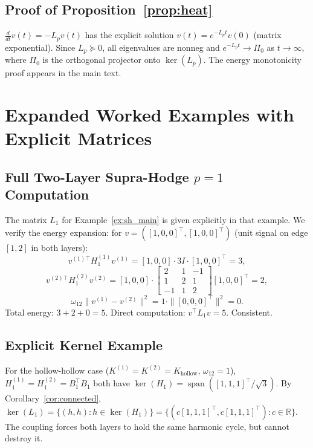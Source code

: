 \documentclass[11pt]{article}
\theoremstyle{definition}
\theoremstyle{remark}
\newcommand{\R}{\mathbb{R}}
\DeclareMathOperator{\spn}{span}
\begin{document}
\subsection{Proof of Proposition~\ref{prop:heat}}

$\frac{d}{dt}v(t) = -L_p v(t)$ has the explicit solution
$v(t)=e^{-L_p t}v(0)$ (matrix exponential). Since $L_p\succeq 0$, all
eigenvalues are nonneg and $e^{-L_p t}\to\Pi_0$ as $t\to\infty$, where
$\Pi_0$ is the orthogonal projector onto $\ker(L_p)$. The energy monotonicity
proof appears in the main text.

\clearpage
\section{Expanded Worked Examples with Explicit Matrices}
\label{app:examples}

\subsection{\texorpdfstring{Full Two-Layer Supra-Hodge $p=1$ Computation}{Full Two-Layer Supra-Hodge p=1 Computation}}

The matrix $L_1$ for Example~\ref{ex:sh_main} is given explicitly in that
example. We verify the energy expansion: for $v=([1,0,0]^\top,[1,0,0]^\top)$
(unit signal on edge $[1,2]$ in both layers):
\[
  v^{(1)\top}H_1^{(1)}v^{(1)} = [1,0,0]\cdot 3I\cdot[1,0,0]^\top = 3,
\]
\[
  v^{(2)\top}H_1^{(2)}v^{(2)} = [1,0,0]\cdot\begin{bmatrix}2&1&-1\\1&2&1\\-1&1&2\end{bmatrix}[1,0,0]^\top = 2,
\]
\[
  \omega_{12}\|v^{(1)}-v^{(2)}\|^2 = 1\cdot\|[0,0,0]^\top\|^2 = 0.
\]
Total energy: $3+2+0=5$. Direct computation: $v^\top L_1 v = 5$. Consistent.

\subsection{Explicit Kernel Example}

For the hollow-hollow case ($K^{(1)}=K^{(2)}=K_{\mathrm{hollow}}$, $\omega_{12}=1$),
$H_1^{(1)}=H_1^{(2)}=B_1^\top B_1$ both have $\ker(H_1)=\spn([1,1,1]^\top/\sqrt{3})$.
By Corollary~\ref{cor:connected}, $\ker(L_1)=\{(h,h):h\in\ker(H_1)\}=
\{(c[1,1,1]^\top,c[1,1,1]^\top):c\in\R\}$. The coupling forces both layers to
hold the same harmonic cycle, but cannot destroy it.
\end{document}
